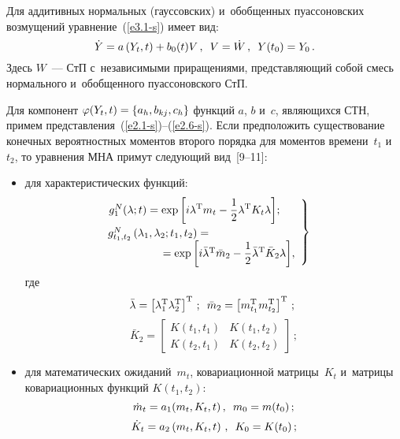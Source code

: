 \begin{multicols}{2}
Для аддитивных нормальных (гауссовских) и~обобщенных пуассоновских возмущений уравнение~(\ref{e3.1-s}) имеет вид:
    \begin{equation}
    \dot Y = a\left(Y_t,t\right)+ b_0 (t) V\,, \enskip V = \dot W\,,\enskip Y(t_0) = Y_0\,.\label{e3.3-s}
    \end{equation}
Здесь $W$~--- СтП с~независимыми приращениями, представляющий собой смесь нормального и~обобщенного пуассоновского СтП.

Для компонент $\vrp(Y_t, t) \hm= \{a_h, b_{kj}, c_h\}$ функций $a$, $b$ и~$c$,  являющихся СТН, примем представления~(\ref{e2.1-s})--(\ref{e2.6-s}).
Если предположить существование конечных вероятностных моментов второго порядка для моментов времени~$t_1$ и~$t_2$, то уравнения МНА примут следующий вид~[9--11]:
\begin{itemize}
\item  для характеристических функций:
    \begin{equation}
\left.
    \begin{array}{c}
   \hspace*{-10mm}g_1^N (\la;t) =\displaystyle\exp \left[ i\la^{\mathrm{T}} m_t - \fr{1}{2} \la^{\mathrm{T}} K_t \la\right]\!;\\[9pt]
       \hspace*{-32mm}g_{t_1, t_2}^N \left(\la_1, \la_2;t_1, t_2 \right) ={}\\
    \hspace*{11mm}{}=\exp \left[ i\bar \la^{\mathrm{T}} \bar m_2 - \fr{1}{2} \bar \la^{\mathrm{T}} \bar K_2 \la\right]\!,
    \end{array}
    \right\}
    \label{e3.4-s}
    \end{equation}
где
    $$
    \bar {\lambda} =\left[ \lambda_1^{\mathrm{T}}\lambda_2^{\mathrm{T}}\right]^{\mathrm{T}}\,; \enskip\bar m_2 = \left[ m_{t_1}^{\mathrm{T}} m_{t_2}^{\mathrm{T}}\right]^{\mathrm{T}}\,;\
    $$
    $$
    \bar K_2= \begin{bmatrix}
    K\left(t_1, t_1\right)& K\left(t_1, t_2\right)\\
    K\left(t_2, t_1\right)& K\left(t_2, t_2\right)\end{bmatrix}\,;
    $$

\item для математических ожиданий~$m_t$, ковариационной матрицы~$K_t$ и~матрицы ковариационных функций $K(t_1, t_2)$:
    \begin{equation}
    \dot m_t = a_1 (m_t, K_t, t)\,,\enskip m_0 = m(t_0)\,;\label{e3.5-s}
    \end{equation}
    \begin{equation}
\dot K_t = a_2 \left(m_t, K_t, t\right)\,,\enskip K_0 = K(t_0)\,;\label{e3.6-s}
\end{equation}


\end{itemize}
\end{multicols}
